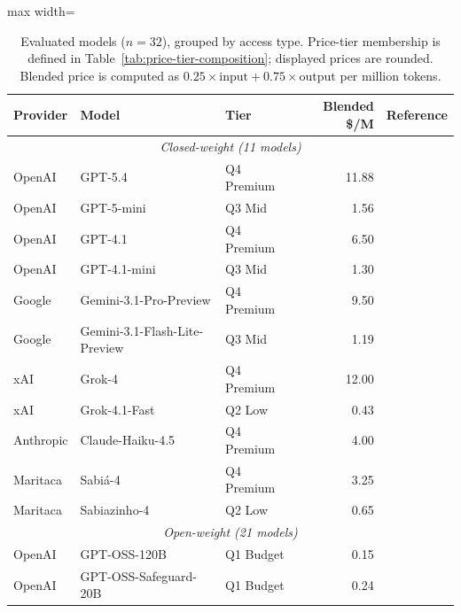 \documentclass{article}
\begin{document}
\begin{table}[h]
\centering
\small
\caption{Evaluated models ($n=32$), grouped by access type. Price-tier membership is defined in Table~\ref{tab:price-tier-composition}; displayed prices are rounded. Blended price is computed as $0.25\times\text{input} + 0.75\times\text{output}$ per million tokens.}
\label{tab:models}
\begin{adjustbox}{max width=\linewidth}
\begin{tabular}{lllrl}
\toprule
\textbf{Provider} & \textbf{Model} & \textbf{Tier} & \textbf{Blended \$/M} & \textbf{Reference} \\
\midrule
\multicolumn{5}{c}{\textit{Closed-weight (11 models)}} \\
\midrule
OpenAI     & GPT-5.4                       & Q4 Premium & 11.88 & \citep{openai2025gpt5} \\
OpenAI     & GPT-5-mini                    & Q3 Mid     &  1.56 & \citep{openai2025gpt5} \\
OpenAI     & GPT-4.1                       & Q4 Premium &  6.50 & \citep{openai2023gpt4} \\
OpenAI     & GPT-4.1-mini                  & Q3 Mid     &  1.30 & \citep{openai2023gpt4} \\
Google     & Gemini-3.1-Pro-Preview        & Q4 Premium &  9.50 & \citep{deepmind2025gemini3pro} \\
Google     & Gemini-3.1-Flash-Lite-Preview & Q3 Mid     &  1.19 & \citep{deepmind2025gemini3pro} \\
xAI        & Grok-4                        & Q4 Premium & 12.00 & \citep{xai2025grok4} \\
xAI        & Grok-4.1-Fast                 & Q2 Low     &  0.43 & \citep{xai2025grok41fast} \\
Anthropic  & Claude-Haiku-4.5              & Q4 Premium &  4.00 & \citep{anthropic2025haiku45} \\
Maritaca   & Sabi\'{a}-4                   & Q4 Premium &  3.25 & \citep{laitz2026sabia4} \\
Maritaca   & Sabiazinho-4                  & Q2 Low     &  0.65 & \citep{laitz2026sabia4} \\
\midrule
\multicolumn{5}{c}{\textit{Open-weight (21 models)}} \\
\midrule
OpenAI     & GPT-OSS-120B                  & Q1 Budget  &  0.15 & \citep{openai2025gptoss} \\
OpenAI     & GPT-OSS-Safeguard-20B         & Q1 Budget  &  0.24 & \citep{openai2025gptosssafeguard} \\

\end{tabular}
\end{adjustbox}
\end{table}
\end{document}
